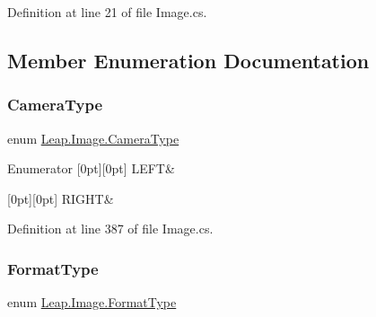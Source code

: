 Definition at line 21 of file Image.\+cs.



\subsection{Member Enumeration Documentation}
\mbox{\label{class_leap_1_1_image_a28310e43e0f2d7f7117e1b45330bdc38}} 
\subsubsection{\texorpdfstring{CameraType}{CameraType}}
{\footnotesize\ttfamily enum \mbox{\hyperlink{class_leap_1_1_image_a28310e43e0f2d7f7117e1b45330bdc38}{Leap.\+Image.\+Camera\+Type}}\hspace{0.3cm}{\ttfamily [strong]}}

\begin{DoxyEnumFields}{Enumerator}
[0pt][0pt]{}\mbox{\label{class_leap_1_1_image_a28310e43e0f2d7f7117e1b45330bdc38a684d325a7303f52e64011467ff5c5758}} 
L\+E\+FT&\\
\hline

[0pt][0pt]{}\mbox{\label{class_leap_1_1_image_a28310e43e0f2d7f7117e1b45330bdc38a21507b40c80068eda19865706fdc2403}} 
R\+I\+G\+HT&\\
\hline

\end{DoxyEnumFields}


Definition at line 387 of file Image.\+cs.

\mbox{\label{class_leap_1_1_image_acefbe5d3803afc9f433a6e3856d242d1}} 
\subsubsection{\texorpdfstring{FormatType}{FormatType}}
{\footnotesize\ttfamily enum \mbox{\hyperlink{class_leap_1_1_image_acefbe5d3803afc9f433a6e3856d242d1}{Leap.\+Image.\+Format\+Type}}\hspace{0.3cm}{\ttfamily [strong]}}



